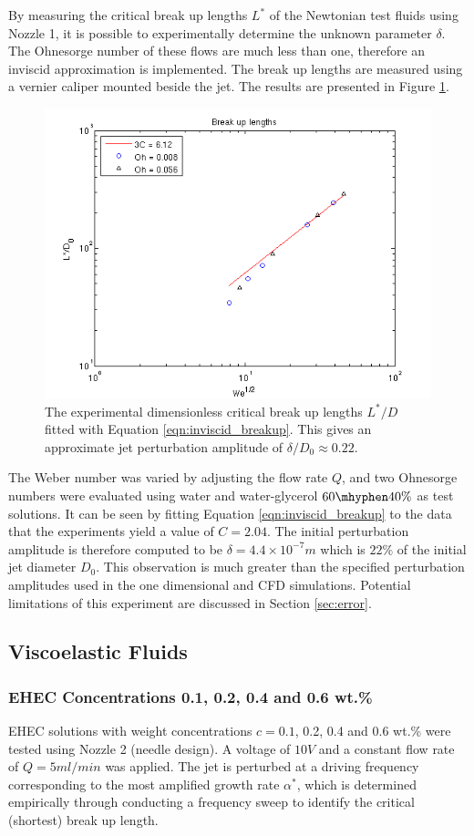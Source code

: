 \documentclass[11pt]{article}
\begin{document}
By measuring the critical break up lengths $L^*$ of the Newtonian test fluids using Nozzle 1, it is possible to experimentally determine the unknown parameter $\delta$. The Ohnesorge number of these flows are much less than one, therefore an inviscid approximation is implemented. The break up lengths are measured using a vernier caliper mounted beside the jet. The results are presented in Figure \ref{fig:breakup}.
\begin{figure}[h]
\centering
	\includegraphics[width = 0.5 \textwidth]{img/breakup.png}
	\caption{The experimental dimensionless critical break up lengths $L^*/D$ fitted with Equation \ref{eqn:inviscid_breakup}. This gives an approximate jet perturbation amplitude of $\delta/D_0 \approx 0.22$.}
	\label{fig:breakup}
\end{figure}

The Weber number was varied by adjusting the flow rate $Q$, and two Ohnesorge numbers were evaluated using water and water-glycerol $60 \mhyphen 40 \%$ as test solutions. It can be seen by fitting Equation \ref{eqn:inviscid_breakup} to the data that the experiments yield a value of $C =2.04$. The initial perturbation amplitude is therefore computed to be $\delta = 4.4 \times 10^{-7} m$ which is $22\%$ of the initial jet diameter $D_0$. This observation is much greater than the specified perturbation amplitudes used in the one dimensional and CFD simulations. Potential limitations of this experiment are discussed in Section \ref{sec:error}. 

\subsection{Viscoelastic Fluids}

\subsubsection{EHEC Concentrations 0.1, 0.2, 0.4 and 0.6 wt.\%} \label{sec:EHEC}
EHEC solutions with weight concentrations $c=0.1$, 0.2, 0.4 and 0.6 wt.\% were tested using Nozzle 2 (needle design). A voltage of $10V$ and a constant flow rate of $Q = 5ml/min$ was applied. The jet is perturbed at a driving frequency corresponding to the most amplified growth rate $\alpha^*$, which is determined empirically through conducting a frequency sweep to identify the critical (shortest) break up length.
\end{document}
